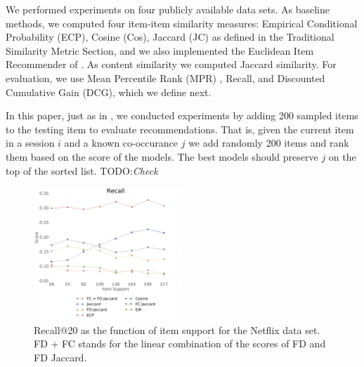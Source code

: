 We performed experiments on four publicly available data sets.
As baseline methods, we computed four item-item similarity measures: Empirical Conditional Probability (ECP), Cosine 
(Cos), Jaccard (JC) as defined in the Traditional Similarity Metric Section, 
and we also implemented the Euclidean Item Recommender of \cite{koenigstein2013towards}. 
As content similarity we computed Jaccard similarity. %
For evaluation, we use Mean Percentile Rank (MPR) \cite{koenigstein2013towards}, Recall, and Discounted Cumulative Gain (DCG), which we define next.

In this paper, just as in \cite{koenigstein2013towards}, we conducted experiments by adding 200 sampled items to the testing item to evaluate recommendations. That is, given the current item in a session $i$ and a known co-occurance $j$ we add randomly 200 items and rank them based on the score of the models. The best models should preserve $j$ on the top of the sorted list. TODO:\textit{Check}

\begin{figure}
\centerline{
  \includegraphics[width=0.5\textwidth]{nf_new.pdf}}
\caption[]{Recall@20 as the function of item support for the Netflix data set.
FD + FC stands for the linear combination of the scores of FD and FD Jaccard.}
\label{fig:supp_netf}
\end{figure}

